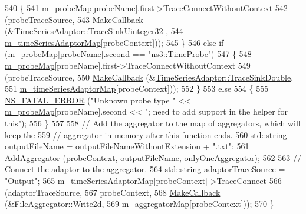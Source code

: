 \begin{DoxyCode}
540     \{
541       \hyperlink{classns3_1_1FileHelper_a69184708162929e89458eed5956791e1}{m\_probeMap}[probeName].first->TraceConnectWithoutContext
542         (probeTraceSource,
543         \hyperlink{group__makecallbackmemptr_ga9376283685aa99d204048d6a4b7610a4}{MakeCallback} (&\hyperlink{classns3_1_1TimeSeriesAdaptor_add04eee090a86dc859b2415710c85b30}{TimeSeriesAdaptor::TraceSinkUinteger32}
      ,
544                       \hyperlink{classns3_1_1FileHelper_a2e55bee0c776ab5f14cc2d4dfbfcc361}{m\_timeSeriesAdaptorMap}[probeContext]));
545     \}
546   \textcolor{keywordflow}{else} \textcolor{keywordflow}{if} (\hyperlink{classns3_1_1FileHelper_a69184708162929e89458eed5956791e1}{m\_probeMap}[probeName].second == \textcolor{stringliteral}{"ns3::TimeProbe"})
547     \{
548       \hyperlink{classns3_1_1FileHelper_a69184708162929e89458eed5956791e1}{m\_probeMap}[probeName].first->TraceConnectWithoutContext
549         (probeTraceSource,
550         \hyperlink{group__makecallbackmemptr_ga9376283685aa99d204048d6a4b7610a4}{MakeCallback} (&\hyperlink{classns3_1_1TimeSeriesAdaptor_a7b5499ffc99cfe741948166ede81980a}{TimeSeriesAdaptor::TraceSinkDouble},
551                       \hyperlink{classns3_1_1FileHelper_a2e55bee0c776ab5f14cc2d4dfbfcc361}{m\_timeSeriesAdaptorMap}[probeContext]));
552     \}
553   \textcolor{keywordflow}{else}
554     \{
555       \hyperlink{group__fatal_ga5131d5e3f75d7d4cbfd706ac456fdc85}{NS\_FATAL\_ERROR} (\textcolor{stringliteral}{"Unknown probe type "} << \hyperlink{classns3_1_1FileHelper_a69184708162929e89458eed5956791e1}{m\_probeMap}[probeName].second << \textcolor{stringliteral}{";
       need to add support in the helper for this"});
556     \}
557 
558   \textcolor{comment}{// Add the aggregator to the map of aggregators, which will keep the}
559   \textcolor{comment}{// aggregator in memory after this function ends.}
560   std::string outputFileName = outputFileNameWithoutExtension + \textcolor{stringliteral}{".txt"};
561   \hyperlink{classns3_1_1FileHelper_a8aed14bd67ec9d0cc15a9ed43a4635df}{AddAggregator} (probeContext, outputFileName, onlyOneAggregator);
562 
563   \textcolor{comment}{// Connect the adaptor to the aggregator.}
564   std::string adaptorTraceSource = \textcolor{stringliteral}{"Output"};
565   \hyperlink{classns3_1_1FileHelper_a2e55bee0c776ab5f14cc2d4dfbfcc361}{m\_timeSeriesAdaptorMap}[probeContext]->TraceConnect
566     (adaptorTraceSource,
567     probeContext,
568     \hyperlink{group__makecallbackmemptr_ga9376283685aa99d204048d6a4b7610a4}{MakeCallback} (&\hyperlink{classns3_1_1FileAggregator_a8362a3f2a401ad7220cb7b17bb3e3808}{FileAggregator::Write2d},
569                   \hyperlink{classns3_1_1FileHelper_a3720f097dd381b699a2b852def0f4168}{m\_aggregatorMap}[probeContext]));
570 \}
\end{DoxyCode}


